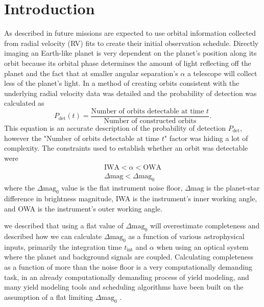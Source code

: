 \section{Introduction}
\label{sec:accurate_pdet_intro}

As described in  future missions are expected to use
orbital information collected from radial velocity (RV) fits to create their
initial observation schedule. Directly imaging an Earth-like planet is very
dependent on the planet's position along its orbit because its orbital phase
determines the amount of light reflecting off the planet and the fact that at
smaller angular separation's $\alpha$ a telescope will collect less of the planet's
light. In  a method of creating orbits consistent
with the underlying radial velocity data was detailed and the probability
of detection was calculated as
\begin{equation}
    P_{\textrm{det}}(t) = \frac{\textrm{Number of orbits detectable at time $t$}}{\textrm{Number of
    constructed orbits}}
.\end{equation}
This equation is an accurate description of the probability of detection
$P_\textrm{det}$, however the "Number of orbits detectable at time $t$" factor
was hiding a lot of complexity. The constraints used to establish whether an orbit
was detectable were
\begin{align}
    \text{IWA} < \alpha < \text{OWA}\\
    \Delta\mathrm{mag} < \Delta\mathrm{mag}_0
\end{align}
where the $\Delta\textrm{mag}_0$ value is the flat instrument noise floor,
$\Delta\textrm{mag}$ is the planet-star difference in brightness magnitude, IWA
is the instrument's inner working angle, and OWA is the instrument's outer
working angle.

 we described that using a flat value of
$\Delta\textrm{mag}_0$ will overestimate completeness and described how we can
calculate $\Delta\textrm{mag}_0$ as a function of various astrophysical inputs,
primarily the integration time $t_\textrm{int}$ and $\alpha$ when using an
optical system where the planet and background signals are coupled. Calculating
completeness as a function of more than the noise floor is a very
computationally demanding task, in an already computationally demanding process
of yield modeling, and many yield modeling tools and scheduling algorithms have
been built on the assumption of a flat limiting $\Delta\textrm{mag}_0$
\citep{savranskyAnalyzingDesignsPlanetFinding2010,starkMaximizingExoEarthCandidate2014,
keithlyOptimalScheduling2020, garrettAnalyticalFormulation2016,
keithlyIntegrationTime2021, morganFasterExoEarth2021}.

